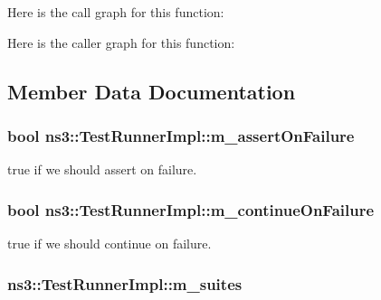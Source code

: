 Here is the call graph for this function\+:




Here is the caller graph for this function\+:




\subsection{Member Data Documentation}
\subsubsection[{\texorpdfstring{m\+\_\+assert\+On\+Failure}{m_assertOnFailure}}]{\setlength{\rightskip}{0pt plus 5cm}bool ns3\+::\+Test\+Runner\+Impl\+::m\+\_\+assert\+On\+Failure\hspace{0.3cm}{\ttfamily [private]}}\hypertarget{classns3_1_1TestRunnerImpl_a0dad11e28c0c9dfd308fabeb297762ec}{}\label{classns3_1_1TestRunnerImpl_a0dad11e28c0c9dfd308fabeb297762ec}


{\ttfamily true} if we should assert on failure. 

\subsubsection[{\texorpdfstring{m\+\_\+continue\+On\+Failure}{m_continueOnFailure}}]{\setlength{\rightskip}{0pt plus 5cm}bool ns3\+::\+Test\+Runner\+Impl\+::m\+\_\+continue\+On\+Failure\hspace{0.3cm}{\ttfamily [private]}}\hypertarget{classns3_1_1TestRunnerImpl_a4302ab85e8be3b0d88b240b556248daf}{}\label{classns3_1_1TestRunnerImpl_a4302ab85e8be3b0d88b240b556248daf}


{\ttfamily true} if we should continue on failure. 

\subsubsection[{\texorpdfstring{m\+\_\+suites}{m_suites}}]{ ns3\+::\+Test\+Runner\+Impl\+::m\+\_\+suites\hspace{0.3cm}{\ttfamily [private]}}\hypertarget{classns3_1_1TestRunnerImpl_ad9c1c25956dd113f924cfcdad60f236c}{}\label{classns3_1_1TestRunnerImpl_ad9c1c25956dd113f924cfcdad60f236c}


